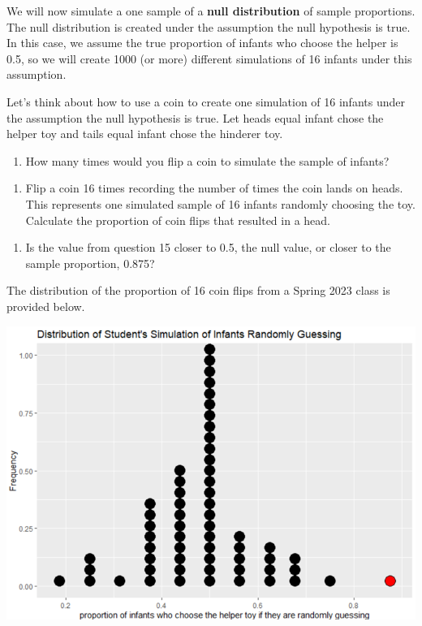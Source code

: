 \documentclass[
]{report}
\providecommand{\tightlist}{%
  \setlength{\itemsep}{0pt}\setlength{\parskip}{0pt}}
\begin{document}
We will now simulate a one sample of a \textbf{null distribution} of sample proportions. The null distribution is created under the assumption the null hypothesis is true. In this case, we assume the true proportion of infants who choose the helper is 0.5, so we will create 1000 (or more) different simulations of 16 infants under this assumption.

Let's think about how to use a coin to create one simulation of 16 infants under the assumption the null hypothesis is true. Let heads equal infant chose the helper toy and tails equal infant chose the hinderer toy.

\begin{enumerate}
\def\labelenumi{\arabic{enumi}.}
\setcounter{enumi}{13}
\tightlist
\item
  How many times would you flip a coin to simulate the sample of infants?
\end{enumerate}

\vspace{0.3in}

\begin{enumerate}
\def\labelenumi{\arabic{enumi}.}
\setcounter{enumi}{14}
\tightlist
\item
  Flip a coin 16 times recording the number of times the coin lands on heads. This represents one simulated sample of 16 infants randomly choosing the toy. Calculate the proportion of coin flips that resulted in a head.
\end{enumerate}

\vspace{0.3in}

\begin{enumerate}
\def\labelenumi{\arabic{enumi}.}
\setcounter{enumi}{15}
\tightlist
\item
  Is the value from question 15 closer to 0.5, the null value, or closer to the sample proportion, 0.875?
\end{enumerate}

\vspace{0.3in}

\newpage

The distribution of the proportion of 16 coin flips from a Spring 2023 class is provided below.

\begin{center}\includegraphics[width=0.75\linewidth]{images/class_simulations_oca06} \end{center}
\end{document}
